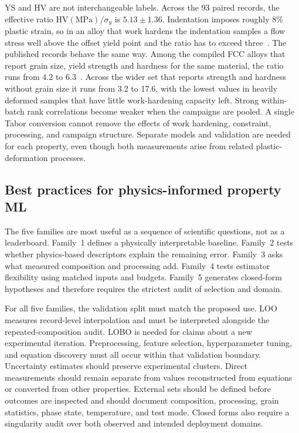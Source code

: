 \documentclass[5p,times,twocolumn]{elsarticle}
\begin{document}
YS and HV are not interchangeable labels. Across the 93 paired records, the effective ratio $\mathrm{HV(MPa)}/\sigma_y$ is $5.13\pm1.36$. Indentation imposes roughly 8\% plastic strain, so in an alloy that work hardens the indentation samples a flow stress well above the offset yield point and the ratio has to exceed three~\cite{Tabor1951,Figueiredo2023}. The published records behave the same way. Among the compiled FCC alloys that report grain size, yield strength and hardness for the same material, the ratio runs from 4.2 to 6.3~\cite{Borg2020}. Across the wider set that reports strength and hardness without grain size it runs from 3.2 to 17.6, with the lowest values in heavily deformed samples that have little work-hardening capacity left. Strong within-batch rank correlations become weaker when the campaigns are pooled. A single Tabor conversion cannot remove the effects of work hardening, constraint, processing, and campaign structure. Separate models and validation are needed for each property, even though both measurements arise from related plastic-deformation processes.

\subsection{Best practices for physics-informed property ML}

The five families are most useful as a sequence of scientific questions, not as a leaderboard. Family~1 defines a physically interpretable baseline. Family~2 tests whether physics-based descriptors explain the remaining error. Family~3 asks what measured composition and processing add. Family~4 tests estimator flexibility using matched inputs and budgets. Family~5 generates closed-form hypotheses and therefore requires the strictest audit of selection and domain.

For all five families, the validation split must match the proposed use. LOO measures record-level interpolation and must be interpreted alongside the repeated-composition audit. LOBO is needed for claims about a new experimental iteration. Preprocessing, feature selection, hyperparameter tuning, and equation discovery must all occur within that validation boundary. Uncertainty estimates should preserve experimental clusters. Direct measurements should remain separate from values reconstructed from equations or converted from other properties. External sets should be defined before outcomes are inspected and should document composition, processing, grain statistics, phase state, temperature, and test mode. Closed forms also require a singularity audit over both observed and intended deployment domains.
\end{document}
